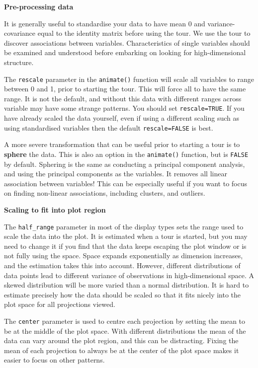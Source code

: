 \documentclass[
  letterpaper,
]{krantz}
\begin{document}
\textbf{Pre-processing data}

It is generally useful to standardise your data to have mean 0 and
variance-covariance equal to the identity matrix before using the tour.
We use the tour to discover associations between variables.
Characteristics of single variables should be examined and understood
before embarking on looking for high-dimensional structure.

The \texttt{rescale} parameter in the \texttt{animate()} function will
scale all variables to range between 0 and 1, prior to starting the
tour. This will force all to have the same range. It is not the default,
and without this data with different ranges across variable may have
some strange patterns. You should set \texttt{rescale=TRUE}. If you have
already scaled the data yourself, even if using a different scaling such
as using standardised variables then the default \texttt{rescale=FALSE}
is best.

A more severe transformation that can be useful prior to starting a tour
is to \textbf{sphere} the data. This is also an option in the
\texttt{animate()} function, but is \texttt{FALSE} by default. Sphering
is the same as conducting a principal component analysis, and using the
principal components as the variables. It removes all linear association
between variables! This can be especially useful if you want to focus on
finding non-linear associations, including clusters, and outliers.

\textbf{Scaling to fit into plot region}

The \texttt{half\_range} parameter in most of the display types sets the
range used to scale the data into the plot. It is estimated when a tour
is started, but you may need to change it if you find that the data
keeps escaping the plot window or is not fully using the space. Space
expands exponentially as dimension increases, and the estimation takes
this into account. However, different distributions of data points lead
to different variance of observations in high-dimensional space. A
skewed distribution will be more varied than a normal distribution. It
is hard to estimate precisely how the data should be scaled so that it
fits nicely into the plot space for all projections viewed.

The \texttt{center} parameter is used to centre each projection by
setting the mean to be at the middle of the plot space. With different
distributions the mean of the data can vary around the plot region, and
this can be distracting. Fixing the mean of each projection to always be
at the center of the plot space makes it easier to focus on other
patterns.
\end{document}
